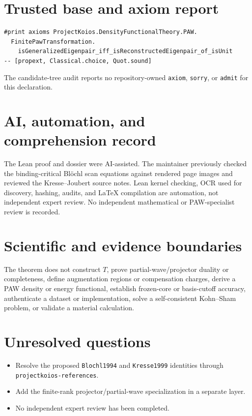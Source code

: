 \section{Trusted base and axiom report}
\begin{lstlisting}
#print axioms ProjectKoios.DensityFunctionalTheory.PAW.
  FinitePawTransformation.
    isGeneralizedEigenpair_iff_isReconstructedEigenpair_of_isUnit
-- [propext, Classical.choice, Quot.sound]
\end{lstlisting}
The candidate-tree audit reports no repository-owned \texttt{axiom}, \texttt{sorry}, or
\texttt{admit} for this declaration.

\section{AI, automation, and comprehension record}
The Lean proof and dossier were AI-assisted.  The maintainer previously checked the binding-critical
Bl\"ochl scan equations against rendered page images and reviewed the Kresse--Joubert source notes.
Lean kernel checking, OCR used for discovery, hashing, audits, and LaTeX compilation are automation,
not independent expert review.  No independent mathematical or PAW-specialist review is recorded.

\section{Scientific and evidence boundaries}
The theorem does not construct $T$, prove partial-wave/projector duality or completeness, define
augmentation regions or compensation charges, derive a PAW density or energy functional, establish
frozen-core or basis-cutoff accuracy, authenticate a dataset or implementation, solve a
self-consistent Kohn--Sham problem, or validate a material calculation.

\section{Unresolved questions}
\begin{itemize}
\item Resolve the proposed \texttt{Blochl1994} and \texttt{Kresse1999} identities through \texttt{projectkoios-references}.
\item Add the finite-rank projector/partial-wave specialization in a separate layer.
\item No independent expert review has been completed.
\end{itemize}

